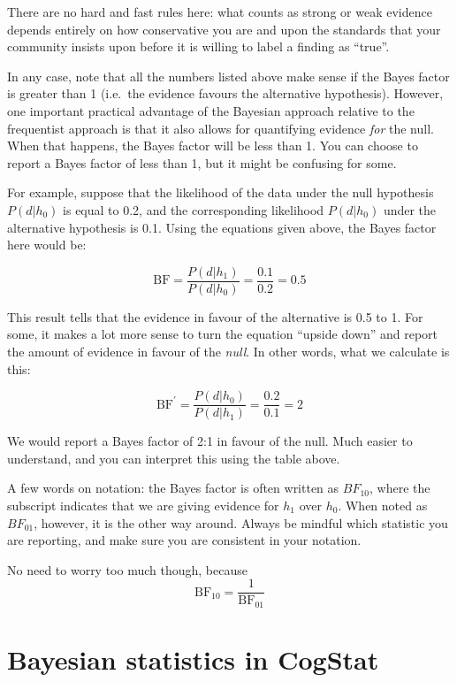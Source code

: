 \documentclass[
]{book}
\theoremstyle{definition}
\theoremstyle{definition}
\theoremstyle{definition}
\theoremstyle{definition}
\theoremstyle{remark}
\begin{document}
There are no hard and fast rules here: what counts as strong or weak evidence depends entirely on how conservative you are and upon the standards that your community insists upon before it is willing to label a finding as ``true''.

In any case, note that all the numbers listed above make sense if the Bayes factor is greater than 1 (i.e.~the evidence favours the alternative hypothesis). However, one important practical advantage of the Bayesian approach relative to the frequentist approach is that it also allows for quantifying evidence \emph{for} the null. When that happens, the Bayes factor will be less than 1. You can choose to report a Bayes factor of less than 1, but it might be confusing for some.

For example, suppose that the likelihood of the data under the null hypothesis \(P(d|h_0)\) is equal to 0.2, and the corresponding likelihood \(P(d|h_0)\) under the alternative hypothesis is 0.1. Using the equations given above, the Bayes factor here would be:

\[ 
\mbox{BF} = \frac{P(d|h_1)}{P(d|h_0)} = \frac{0.1}{0.2} = 0.5
\]

This result tells that the evidence in favour of the alternative is 0.5 to 1. For some, it makes a lot more sense to turn the equation ``upside down'' and report the amount of evidence in favour of the \emph{null}. In other words, what we calculate is this:

\[ 
\mbox{BF}^\prime = \frac{P(d|h_0)}{P(d|h_1)} = \frac{0.2}{0.1} = 2
\]

We would report a Bayes factor of 2:1 in favour of the null. Much easier to understand, and you can interpret this using the table above.

A few words on notation: the Bayes factor is often written as \(BF_{10}\), where the subscript indicates that we are giving evidence for \(h_1\) over \(h_0\). When noted as \(BF_{01}\), however, it is the other way around. Always be mindful which statistic you are reporting, and make sure you are consistent in your notation.

No need to worry too much though, because
\[
\mbox{BF}_{10} = \frac{1}{\mbox{BF}_{01}}
\]

\hypertarget{bayesian-statistics-in-cogstat}{%
\section{Bayesian statistics in CogStat}\label{bayesian-statistics-in-cogstat}}
\end{document}
